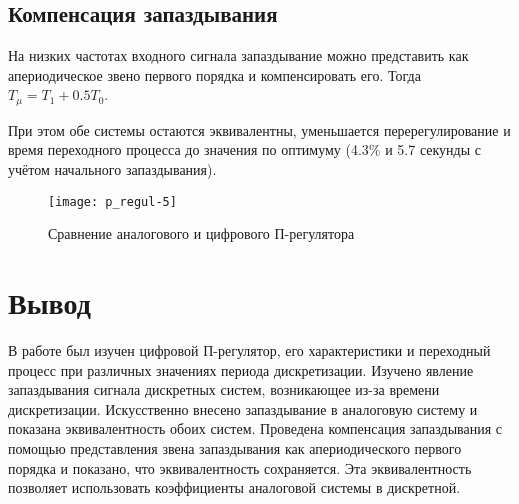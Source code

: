     \subsection{Компенсация запаздывания}
    На низких частотах входного сигнала запаздывание можно представить как апериодическое звено первого порядка и
    компенсировать его. Тогда $T_\mu = T_1 + 0.5T_0$.

    При этом обе системы остаются эквивалентны, уменьшается перерегулирование и время переходного процесса до значения
    по оптимуму (4.3\% и 5.7 секунды с учётом начального запаздывания).
    \begin{figure}[H]
        \centering\texttt{[image: p\_regul-5]}
        \caption{Сравнение аналогового и цифрового П-регулятора}
    \end{figure}


    \section{Вывод}
    В работе был изучен цифровой П-регулятор, его характеристики и переходный процесс при различных значениях периода
    дискретизации.
    Изучено явление запаздывания сигнала дискретных систем, возникающее из-за времени дискретизации. 
    Искусственно внесено запаздывание в аналоговую систему и показана эквивалентность обоих систем. 
    Проведена компенсация запаздывания с помощью представления звена запаздывания как
    апериодического первого порядка и показано, что эквивалентность сохраняется.
    Эта эквивалентность позволяет использовать коэффициенты аналоговой системы в дискретной.

